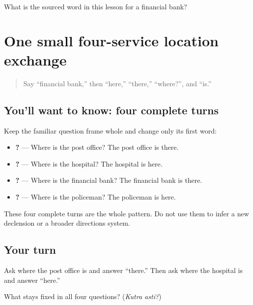 \begin{tcolorbox}[breakable,colback=teal!4,colframe=teal!35!black,title={Before you move on}]
What is the sourced word in this lesson for a financial bank?
\end{tcolorbox}
\section[Practice]{One small four-service location exchange}

\label{lesson:SA-C268-post-health-location}



\begin{quote}
Say “financial bank,” then “here,” “there,” “where?”, and “is.”
\end{quote}

\subsection*{You'll want to know: four complete turns}
Keep the familiar question frame whole and change only its first word:

\begin{itemize}
\raggedright
  \item \textbf{  ?   } — Where is the post office? The post office is there.
  \item \textbf{  ?   } — Where is the hospital? The hospital is here.
  \item \textbf{  ?   } — Where is the financial bank? The financial bank is there.
  \item \textbf{  ?   } — Where is the policeman? The policeman is here.
\end{itemize}

These four complete turns are the whole pattern. Do not use them to infer a new declension or a broader directions system.

\subsection*{Your turn}
Ask where the post office is and answer “there.” Then ask where the hospital is and answer “here.”

\begin{tcolorbox}[breakable,colback=teal!4,colframe=teal!35!black,title={Before you move on}]
What stays fixed in all four questions? (\emph{Kutra asti?})
\end{tcolorbox}
